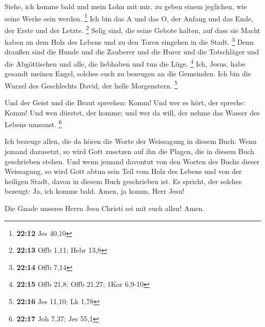  Siehe, ich komme bald und mein Lohn mit mir, zu geben
einem jeglichen, wie seine Werke sein werden. \footnote{\textbf{22:12}
  Jes 40,10}  Ich bin das A und das O, der Anfang und das
Ende, der Erste und der Letzte. \footnote{\textbf{22:13} Offb 1,11; Hebr
  13,8}  Selig sind, die seine Gebote halten, auf dass sie
Macht haben an dem Holz des Lebens und zu den Toren eingehen in die
Stadt. \footnote{\textbf{22:14} Offb 7,14}  Denn draußen
sind die Hunde und die Zauberer und die Hurer und die Totschläger und
die Abgöttischen und alle, die liebhaben und tun die Lüge. \footnote{\textbf{22:15}
  Offb 21,8; Offb 21,27; 1Kor 6,9-10}  Ich, Jesus, habe
gesandt meinen Engel, solches euch zu bezeugen an die Gemeinden. Ich bin
die Wurzel des Geschlechts David, der helle Morgenstern. \footnote{\textbf{22:16}
  Jes 11,10; Lk 1,78}

 Und der Geist und die Braut sprechen: Komm! Und wer es
hört, der spreche: Komm! Und wen dürstet, der komme; und wer da will,
der nehme das Wasser des Lebens umsonst. \footnote{\textbf{22:17} Joh
  7,37; Jes 55,1}

 Ich bezeuge allen, die da hören die Worte der Weissagung
in diesem Buch: Wenn jemand dazusetzt, so wird Gott zusetzen auf ihn die
Plagen, die in diesem Buch geschrieben stehen.  Und wenn
jemand davontut von den Worten des Buchs dieser Weissagung, so wird Gott
abtun sein Teil vom Holz des Lebens und von der heiligen Stadt, davon in
diesem Buch geschrieben ist.  Es spricht, der solches
bezeugt: Ja, ich komme bald. Amen, ja komm, Herr Jesu!

 Die Gnade unseres Herrn Jesu Christi sei mit euch allen!
Amen.
